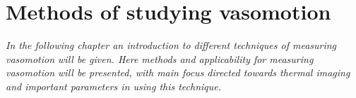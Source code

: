 \chapter{Methods of studying vasomotion}

\textit{In the following chapter an introduction to different techniques of measuring vasomotion will be given. Here methods and applicability for measuring vasomotion will be presented, with main focus directed towards thermal imaging and important parameters in using this technique.}